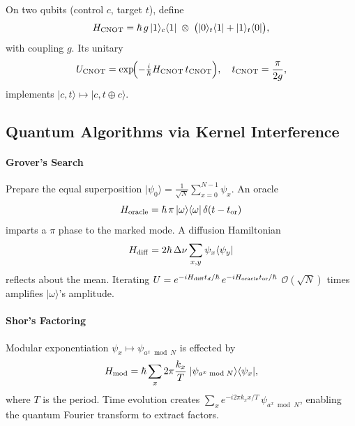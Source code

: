 \begin{definition}\label{def:cnot_ham}
On two qubits (control $c$, target $t$), define
\begin{equation}\label{eq:H_cnot}
H_{\rm CNOT}
= \hbar\,g\,|1\rangle_c\langle1|\;\otimes\;
\bigl(|0\rangle_t\langle1| + |1\rangle_t\langle0|\bigr),
\end{equation}
with coupling $g$.  Its unitary
\begin{equation}\label{eq:U_cnot}
U_{\rm CNOT}
= \exp\!\Bigl(-\tfrac{i}{\hbar}H_{\rm CNOT}\,t_{\rm CNOT}\Bigr),
\quad
t_{\rm CNOT} = \frac{\pi}{2g},
\end{equation}
implements $|c,t\rangle\mapsto|c,t\oplus c\rangle$.
\end{definition}

\subsection{Quantum Algorithms via Kernel Interference}

\paragraph{Grover’s Search}
Prepare the equal superposition
\(\displaystyle|\psi_0\rangle = \frac{1}{\sqrt N}\sum_{x=0}^{N-1}\psi_x.\)
An oracle
\begin{equation}\label{eq:H_oracle}
H_{\rm oracle} = \hbar\,\pi\,|\omega\rangle\langle\omega|\,\delta(t - t_{\rm or})
\end{equation}
imparts a $\pi$ phase to the marked mode.  A diffusion Hamiltonian
\[
H_{\rm diff} = 2\hbar\,\Delta\nu\sum_{x,y}\psi_x\langle\psi_y|
\]
reflects about the mean.  Iterating 
$U = e^{-iH_{\rm diff}t_d/\hbar}\,e^{-iH_{\rm oracle}t_{\rm or}/\hbar}$
$\mathcal O(\sqrt N)$ times amplifies $|\omega\rangle$’s amplitude.

\paragraph{Shor’s Factoring}
Modular exponentiation
\(\psi_x\mapsto\psi_{a^x\!\bmod N}\)
is effected by
\begin{equation}\label{eq:H_modexp}
H_{\rm mod} = \hbar\sum_{x}2\pi\frac{k_x}{T}\;|\psi_{a^x\bmod N}\rangle\langle\psi_x|,
\end{equation}
where $T$ is the period.  Time evolution creates
\(\sum_x e^{-i2\pi k_x x/T}\,\psi_{a^x\bmod N}\),
enabling the quantum Fourier transform to extract factors.


